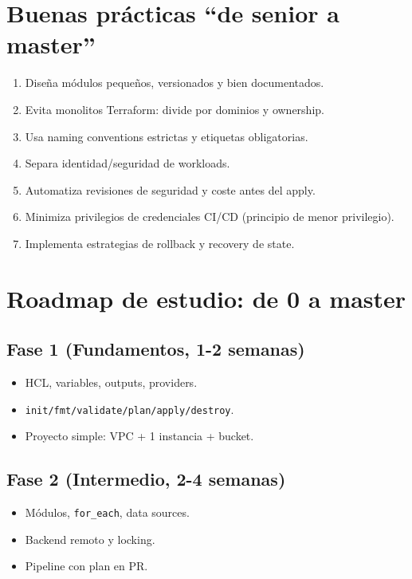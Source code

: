 \documentclass[12pt,a4paper]{article}
\begin{document}
\section{Buenas prácticas ``de senior a master''}

\begin{enumerate}
		\item Diseña módulos pequeños, versionados y bien documentados.
		\item Evita monolitos Terraform: divide por dominios y ownership.
		\item Usa naming conventions estrictas y etiquetas obligatorias.
		\item Separa identidad/seguridad de workloads.
		\item Automatiza revisiones de seguridad y coste antes del apply.
		\item Minimiza privilegios de credenciales CI/CD (principio de menor privilegio).
		\item Implementa estrategias de rollback y recovery de state.
\end{enumerate}

\section{Roadmap de estudio: de 0 a master}

\subsection*{Fase 1 (Fundamentos, 1-2 semanas)}
\begin{itemize}
		\item HCL, variables, outputs, providers.
		\item \texttt{init/fmt/validate/plan/apply/destroy}.
		\item Proyecto simple: VPC + 1 instancia + bucket.
\end{itemize}

\subsection*{Fase 2 (Intermedio, 2-4 semanas)}
\begin{itemize}
		\item Módulos, \texttt{for\_each}, data sources.
		\item Backend remoto y locking.
		\item Pipeline con plan en PR.
\end{itemize}
\end{document}
